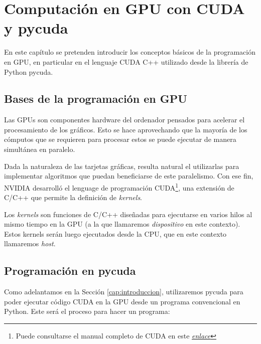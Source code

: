 \chapter{Computación en \ac{GPU} con CUDA y pycuda}
\label{cap:computacion}

\begin{resumen}
	En este capítulo se pretenden introducir los conceptos básicos de la programación en \ac{GPU}, en particular en el lenguaje CUDA C++ utilizado desde la librería de Python pycuda.
\end{resumen}


\section{Bases de la programación en \ac{GPU}}
Las \ac{GPU}s son componentes hardware del ordenador pensados para acelerar el procesamiento de los gráficos. Esto se hace aprovechando que la mayoría de los cómputos que se requieren para procesar estos se puede ejecutar de manera simultánea en paralelo.

Dada la naturaleza de las tarjetas gráficas, resulta natural el utilizarlas para implementar algoritmos que puedan beneficiarse de este paralelismo. Con ese fin, NVIDIA desarrolló el lenguage de programación \ac{CUDA}\footnote{Puede consultarse el manual completo de \ac{CUDA} en este \href{https://docs.nvidia.com/cuda/pdf/CUDA_C_Programming_Guide.pdf}{\emph{enlace}}}, una extensión de C/C++ que permite la definición de \emph{kernels}. 

Los \emph{kernels} son funciones de C/C++ diseñadas para ejecutarse en varios hilos al mismo tiempo en la \ac{GPU} (a la que llamaremos \emph{dispositivo} en este contexto). Estos kernels serán luego ejecutados desde la \ac{CPU}, que en este contexto llamaremos \emph{host}.



\section{Programación en pycuda}
Como adelantamos en la Sección \ref{cap:introduccion}, utilizaremos pycuda para poder ejecutar código \ac{CUDA} en la GPU desde un programa convencional en Python. Este será el proceso para hacer un programa:

